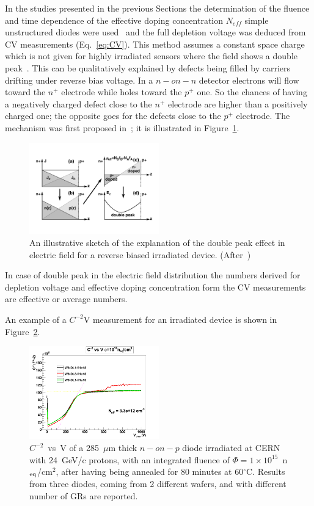 In the studies presented in the previous Sections the determination of the fluence and time 
dependence of the effective doping concentration  $N_{eff}$
simple unstructured diodes were used~\cite{moll-thesis} 
and the full depletion voltage was deduced from CV 
measurements (Eq.~\ref{eq:CV}). This method assumes a constant space charge which is not 
given 
for highly irradiated sensors where the field shows a double peak~\cite{Li1992}. This can be 
qualitatively explained by defects being filled by carriers drifting under reverse bias voltage. 
In a $n-on-n$ detector electrons will flow toward the $n^+$ electrode while holes toward the $p^+$ one. 
So the chances of having a negatively charged defect close to the   $n^+$ electrode  are higher 
than a positively charged one; the opposite goes for the defects close to the $p^+$ electrode. 
The mechanism was first proposed in~\cite{bib:DP};
 it is illustrated in Figure~\ref{fig:Chiochia2005DP}.
\begin{figure}[htpb]
 \centering
 \includegraphics[width=0.5\textwidth]{Chiochia2005DP.pdf}
 \caption{\label{fig:Chiochia2005DP} An illustrative sketch of the explanation of the double peak effect in electric field  for a reverse biased irradiated device. (After~\cite{Chiochia2005})}
 \end{figure}

In case of double peak in the electric field distribution the numbers derived for depletion voltage and 
effective doping concentration form the CV measurements 
are effective or average numbers.

An example of a $C^{-2}$V measurement for an irradiated device is shown in Figure~\ref{fig:irrCV}.
\begin{figure}[htpb]
 \centering
\includegraphics[width=0.5\textwidth]{irrad2011-fl1e15-best.png}
 \caption{\label{fig:irrCV} $C^{-2}$~vs~V of a 285~$\mu$m thick $n-on-p$ diode irradiated at CERN 
 with 24~GeV/c protons, with an integrated fluence of $\Phi=1\times10^{15}$~n$_{\rm eq}$/cm$^2$, 
 after having being annealed for 80 minutes at 60$^\circ$C. Results from three diodes, 
 coming from 2 different 
 wafers, and with different number of GRs are reported.}  
 \end{figure}
 
